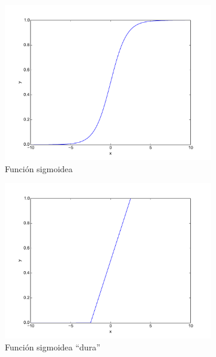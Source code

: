 \begin{figure}
	\begin{subfigure}[b]{0.5\textwidth}
		\centering
		\includegraphics[width=\linewidth]{imagenes/metodos/sigmoid.pdf}
		\caption{Función sigmoidea}
		\label{fig:metodos/sigmoid}
	\end{subfigure}
	\begin{subfigure}[b]{0.5\textwidth}
		\centering
		\includegraphics[width=\linewidth]{imagenes/metodos/hard-sigmoid.pdf}
		\caption{Función sigmoidea ``dura''}
		\label{fig:metodos/hard-sigmoid}
	\end{subfigure}
	\begin{subfigure}[b]{0.5\textwidth}
		\centering

\end{subfigure}
\end{figure}
